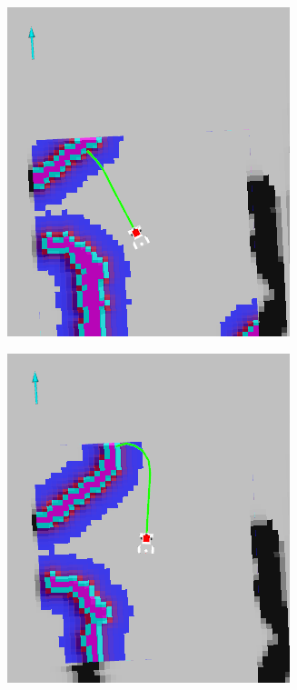 \documentclass{beamer}
\begin{document}
\begin{frame}
\begin{figure}[H]
\begin{subfigure}[b]{0.24\textwidth}
        \includegraphics[width=\textwidth]{img/succ_1.png}
    \end{subfigure}
    \hfill
    \begin{subfigure}[b]{0.24\textwidth}
        \centering
        \includegraphics[width=\textwidth]{img/succ_2.png}

\end{subfigure}
\end{figure}
\end{frame}
\end{document}
